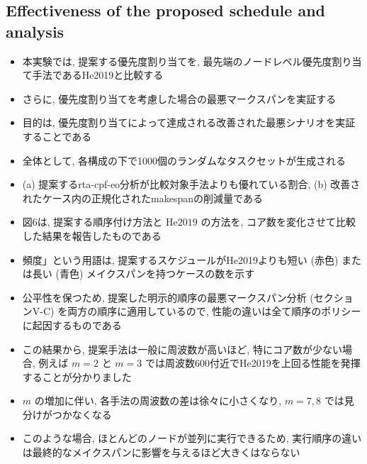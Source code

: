 \subsection{Effectiveness of the proposed schedule and analysis}
\label{ssec: Effectiveness of the proposed schedule and analysis}

\begin{frame}{}
    \begin{itemize}
        \item 本実験では, 提案する優先度割り当てを, 最先端のノードレベル優先度割り当て手法であるHe2019と比較する
\item さらに, 優先度割り当てを考慮した場合の最悪マークスパンを実証する
\item 目的は, 優先度割り当てによって達成される改善された最悪シナリオを実証することである
\item 全体として, 各構成の下で1000個のランダムなタスクセットが生成される
\item (a) 提案するrta-cpf-eo分析が比較対象手法よりも優れている割合, (b) 改善されたケース内の正規化されたmakespanの削減量である
    \end{itemize}
\end{frame}

\begin{frame}{}
    \begin{itemize}
        \item 図6は, 提案する順序付け方法と $\mathrm{He} 2019$ の方法を, コア数を変化させて比較した結果を報告したものである
\item 頻度」という用語は, 提案するスケジュールがHe2019よりも短い (赤色) または長い (青色) メイクスパンを持つケースの数を示す
\item 公平性を保つため, 提案した明示的順序の最悪マークスパン分析 (セクションV-C) を両方の順序に適用しているので, 性能の違いは全て順序のポリシーに起因するものである
    \end{itemize}
\end{frame}

\begin{frame}{}
    \begin{itemize}
        \item この結果から, 提案手法は一般に周波数が高いほど, 特にコア数が少ない場合, 例えば $m=2$ と $m=3$ では周波数600付近でHe2019を上回る性能を発揮することが分かりました
\item $m$ の増加に伴い, 各手法の周波数の差は徐々に小さくなり, $m=7,8$ では見分けがつかなくなる
\item このような場合, ほとんどのノードが並列に実行できるため, 実行順序の違いは最終的なメイクスパンに影響を与えるほど大きくはならない
    \end{itemize}
\end{frame}

